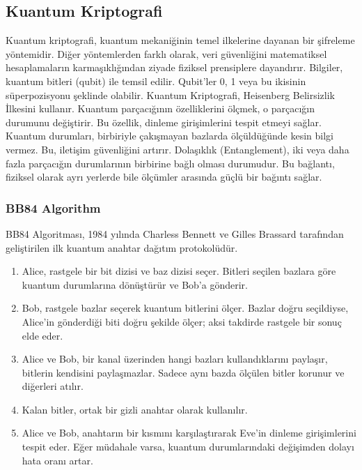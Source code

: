 \newpage

\subsection{Kuantum Kriptografi}

Kuantum kriptografi, kuantum mekaniğinin temel ilkelerine dayanan bir şifreleme yöntemidir. Diğer yöntemlerden farklı olarak, veri güvenliğini matematiksel hesaplamaların karmaşıklığından ziyade fiziksel prensiplere dayandırır. Bilgiler, kuantum bitleri (qubit) ile temsil edilir. Qubit'ler 0, 1 veya bu ikisinin süperpozisyonu şeklinde olabilir. Kuantum Kriptografi, Heisenberg Belirsizlik İlkesini kullanır. Kuantum parçacığının özelliklerini ölçmek, o parçacığın durumunu değiştirir. Bu özellik, dinleme girişimlerini tespit etmeyi sağlar. Kuantum durumları, birbiriyle çakışmayan bazlarda ölçüldüğünde kesin bilgi vermez. Bu, iletişim güvenliğini artırır. Dolaşıklık (Entanglement), iki veya daha fazla parçacığın durumlarının birbirine bağlı olması durumudur. Bu bağlantı, fiziksel olarak ayrı yerlerde bile ölçümler arasında güçlü bir bağıntı sağlar.

\subsubsection{BB84 Algorithm}

BB84 Algoritması, 1984 yılında Charless Bennett ve Gilles Brassard tarafından geliştirilen ilk kuantum anahtar dağıtım protokolüdür. 

\begin{enumerate}
    \item Alice, rastgele bir bit dizisi ve baz dizisi seçer. Bitleri seçilen bazlara göre kuantum durumlarına dönüştürür ve Bob'a gönderir.
    \item Bob, rastgele bazlar seçerek kuantum bitlerini ölçer. Bazlar doğru seçildiyse, Alice'in gönderdiği biti doğru şekilde ölçer; aksi takdirde rastgele bir sonuç elde eder.
    \item Alice ve Bob, bir kanal üzerinden hangi bazları kullandıklarını paylaşır, bitlerin kendisini paylaşmazlar. Sadece aynı bazda ölçülen bitler korunur ve diğerleri atılır.
    \item Kalan bitler, ortak bir gizli anahtar olarak kullanılır.
    \item Alice ve Bob, anahtarın bir kısmını karşılaştırarak Eve'in dinleme girişimlerini tespit eder. Eğer müdahale varsa, kuantum durumlarındaki değişimden dolayı hata oranı artar.
\end{enumerate}

